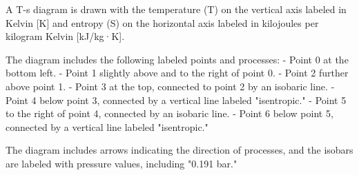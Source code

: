 A T-s diagram is drawn with the temperature (T) on the vertical axis labeled in Kelvin [K] and entropy (S) on the horizontal axis labeled in kilojoules per kilogram Kelvin [kJ/kg·K].  

The diagram includes the following labeled points and processes:  
- Point 0 at the bottom left.  
- Point 1 slightly above and to the right of point 0.  
- Point 2 further above point 1.  
- Point 3 at the top, connected to point 2 by an isobaric line.  
- Point 4 below point 3, connected by a vertical line labeled "isentropic."  
- Point 5 to the right of point 4, connected by an isobaric line.  
- Point 6 below point 5, connected by a vertical line labeled "isentropic."  

The diagram includes arrows indicating the direction of processes, and the isobars are labeled with pressure values, including "0.191 bar."